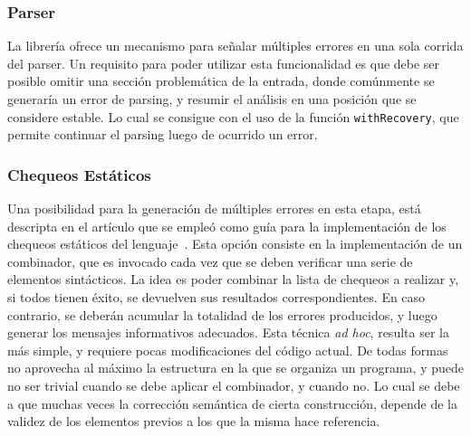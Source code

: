 \subsubsection{Parser}

La librería \Megaparsec{} ofrece un mecanismo para señalar múltiples errores en una sola corrida del parser.
Un requisito para poder utilizar esta funcionalidad es que debe ser posible omitir una sección problemática de la entrada, donde comúnmente se generaría un error de parsing, y resumir el análisis en una posición que se considere estable.
Lo cual se consigue con el uso de la función \lstinline[style = haskell]{withRecovery}, que permite continuar el parsing luego de ocurrido un error.

\iffalse
Si quisiéramos aprovechar esta funcionalidad, deberíamos adaptar nuestro parser.
Debido que identificar cual puede ser un buen punto de recuperación es una tarea compleja, es necesario realizar algunas modificaciones al intérprete para poder facilitar la misma.
Un cambio conveniente posible, sería utilizar el punto y coma (\textbf{;}) para separar la secuencia de instrucciones del lenguaje.
De esta forma, al fallar el parser se podrían consumir \textit{tokens} hasta encontrar este delimitador, punto donde se puede recuperar y continuar el análisis normal del programa.
\fi

\subsubsection{Chequeos Estáticos}

Una posibilidad para la generación de múltiples errores en esta etapa, está descripta en el artículo que se empleó como guía para la implementación de los chequeos estáticos del lenguaje~\cite{MonadicTC}.
Esta opción consiste en la implementación de un combinador, que es invocado cada vez que se deben verificar una serie de elementos sintácticos.
La idea es poder combinar la lista de chequeos a realizar y, si todos tienen éxito, se devuelven sus resultados correspondientes.
En caso contrario, se deberán acumular la totalidad de los errores producidos, y luego generar los mensajes informativos adecuados.
Esta técnica \textit{ad hoc}, resulta ser la más simple, y requiere pocas modificaciones del código actual.
De todas formas no aprovecha al máximo la estructura en la que se organiza un programa, y puede no ser trivial cuando se debe aplicar el combinador, y cuando no.
Lo cual se debe a que muchas veces la corrección semántica de cierta construcción, depende de la validez de los elementos previos a los que la misma hace referencia.

